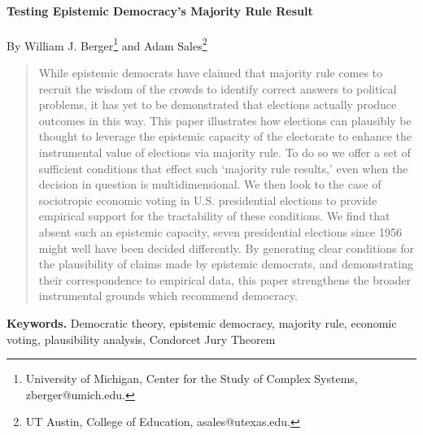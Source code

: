 \documentclass[11pt]{article}
\begin{document}
\begin{titlepage}

\begin{center}
\ \\


\vfill
{\LARGE \bf Testing Epistemic Democracy's Majority Rule Result}\ \\
\ \\
{\Large By William J. Berger\footnote{University of Michigan, Center for the Study of Complex Systems, zberger@umich.edu.} and Adam Sales\footnote{UT Austin, College of Education, asales@utexas.edu.}%
}\\
 \end{center}

\begin{abstract}
\noindent 
While epistemic democrats have claimed that majority rule comes to recruit the wisdom of the crowds to identify correct answers to political problems, it has yet to be demonstrated that  elections actually produce outcomes in this way. This paper illustrates how elections can plausibly be thought to leverage the epistemic capacity of the electorate to enhance the instrumental value of elections via majority rule. To do so we offer a set of sufficient conditions that effect such `majority rule results,' even when the decision in question is multidimensional. We then look to the case of sociotropic economic voting in U.S. presidential elections to provide empirical support for the tractability of these conditions.  We find that absent such an epistemic capacity, seven presidential elections since 1956 might well have been decided differently. By generating clear conditions for the plausibility of claims made by epistemic democrats, and demonstrating their correspondence to empirical data, this paper strengthens the broader instrumental grounds which recommend democracy.
\end{abstract}
\smallskip
\noindent \textbf{Keywords.} Democratic theory, epistemic democracy, majority rule, economic voting, plausibility analysis, Condorcet Jury Theorem
\vfill
\end{titlepage}

\end{document}

